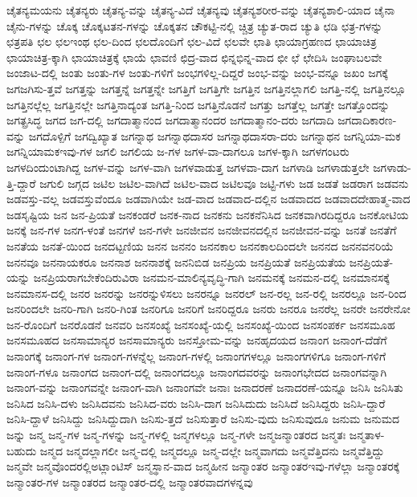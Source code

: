 {ಚೈತನ್ಯಮಯನು
ಚೈತನ್ಯರು
ಚೈತನ್ಯ-ವನ್ನು
ಚೈತನ್ಯ-ವಿದೆ
ಚೈತನ್ಯವು
ಚೈತನ್ಯಶರೀರ-ವನ್ನು
ಚೈತನ್ಯಶಾಲಿ-ಯಾದ
ಚೈನಾ
ಚೈನು-ಗಳನ್ನು
ಚೊಕ್ಕ
ಚೊಕ್ಕಟತನ-ಗಳನ್ನು
ಚೊಕ್ಕತನ
ಚೌಕಟ್ಟಿ-ನಲ್ಲಿ
ಚ್ಚಿತ್ರ
ಚ್ಯುತ-ರಾದ
ಚ್ಯುತಿ
ಛಡಿ
ಛತ್ರ-ಗಳನ್ನು
ಛತ್ರಪತಿ
ಛಲ
ಛಲಇಂಥ
ಛಲ-ದಿಂದ
ಛಲದೊಂದಿಗೆ
ಛಲ-ವಿದೆ
ಛಲವೇ
ಛಾತಿ
ಛಾಯಾಗ್ರಹಣದ
ಛಾಯಾಚಿತ್ರ
ಛಾಯಾಚಿತ್ರ-ಕ್ಕಾಗಿ
ಛಾಯಾಚಿತ್ರಕ್ಕೆ
ಛಾಯೆ
ಛಾವಣಿ
ಛಿದ್ರ-ವಾದ
ಛಿನ್ನಭಿನ್ನ-ವಾದ
ಛೀ
ಛೆ
ಛೇದಿಸಿ
ಜಂಘಾಬಲವೇ
ಜಂಜಾಟ-ದಲ್ಲಿ
ಜಂತು
ಜಂತು-ಗಳ
ಜಂತು-ಗಳಿಗೆ
ಜಂಭಗಳಿಲ್ಲ-ದಿದ್ದರೆ
ಜಂಭ-ವನ್ನು
ಜಂಭ-ವನ್ನೂ
ಜಖಂ
ಜಗಕ್ಕೆ
ಜಗಜಗಿಸು-ತ್ತವೆ
ಜಗತ್ತನ್ನು
ಜಗತ್ತನ್ನೆ
ಜಗತ್ತನ್ನೇ
ಜಗತ್ತಿಗೆ
ಜಗತ್ತಿಗೇ
ಜಗತ್ತಿನ
ಜಗತ್ತಿನಲ್ಲಾಗಲಿ
ಜಗತ್ತಿ-ನಲ್ಲಿ
ಜಗತ್ತಿನಲ್ಲೂ
ಜಗತ್ತಿನಲ್ಲೆಲ್ಲ
ಜಗತ್ತಿನಲ್ಲೇ
ಜಗತ್ತಿನಾದ್ಯಂತ
ಜಗತ್ತಿ-ನಿಂದ
ಜಗತ್ತಿನೊಡನೆ
ಜಗತ್ತು
ಜಗತ್ತೆಲ್ಲ
ಜಗತ್ತೇ
ಜಗತ್ತೊಂದನ್ನು
ಜಗತ್ಪ್ರಸಿದ್ಧ
ಜಗದ
ಜಗ-ದಲ್ಲಿ
ಜಗದಾತ್ಮಾನಂದ
ಜಗದಾತ್ಮಾನಂದರ
ಜಗದಾತ್ಮಾನಂ-ದರು
ಜಗದಾದಿ
ಜಗದಾದಿಕಾರಣ-ವನ್ನು
ಜಗದೊಳ್ಪಿಗೆ
ಜಗದ್ವಿಖ್ಯಾತ
ಜಗನ್ನಾಥ
ಜಗನ್ನಾಥದಾಸರ
ಜಗನ್ನಾಥದಾಸರಾ-ದರು
ಜಗನ್ನಾಥನ
ಜಗನ್ನಿಯಾ-ಮಕ
ಜಗನ್ನಿಯಾಮಕಇವು-ಗಳ
ಜಗಲಿ
ಜಗಲಿಯ
ಜ-ಗಳ
ಜಗಳ-ವಾ-ದಾಗಲೂ
ಜಗಳ-ಕ್ಕಾಗಿ
ಜಗಳಗಂಟರು
ಜಗಳದಿಂದುಂಟಾಗಿದ್ದ
ಜಗಳ-ವನ್ನು
ಜಗಳ-ವಾಗಿ
ಜಗಳವಾಡುತ್ತ
ಜಗಳವಾ-ದಾಗ
ಜಗಳಾಡಿ
ಜಗಳಾಡುತ್ತಲೇ
ಜಗಳಾಡು-ತ್ತಿ-ದ್ದಾರೆ
ಜಗುಲಿ
ಜಗ್ಗದ
ಜಟಿಲ
ಜಟಿಲ-ವಾಗಿದೆ
ಜಟಿಲ-ವಾದ
ಜಟಿಲವೂ
ಜಟ್ಟಿ-ಗಳು
ಜಡ
ಜಡತೆ
ಜಡರಾಗ
ಜಡವನು
ಜಡವಸ್ತು-ವಲ್ಲ
ಜಡವಸ್ತುವೆಂದೂ
ಜಡವಾಗಿಯೇ
ಜಡ-ವಾದ
ಜಡವಾದ-ದಲ್ಲಿನ
ಜಡವಾದದ
ಜಡವಾದದೇಹಾತ್ಮ-ವಾದ
ಜಡಸೃಷ್ಟಿಯ
ಜನ
ಜನ-ಪ್ರಿಯತೆ
ಜನಕಂಡರೆ
ಜನಕ-ನಾದ
ಜನಕನು
ಜನಕನೆನಿಸಿದ
ಜನಕವಾಗಿರದಿದ್ದರೂ
ಜನಕೋಟಿಯ
ಜನಕ್ಕೆ
ಜನ-ಗಳ
ಜನಗ-ಳಂತೆ
ಜನಗಳೆ
ಜನ-ಗಳೇ
ಜನಜೀವನ
ಜನಜೀವನದಲ್ಲಿನ
ಜನಜೀವನ-ವನ್ನು
ಜನತೆ
ಜನತೆಗೆ
ಜನತೆಯ
ಜನತೆ-ಯಿಂದ
ಜನದಟ್ಟಣಿಯ
ಜನನ
ಜನನಂ
ಜನನಕಾಲ
ಜನನಕಾಲದಿಂದಲೇ
ಜನನದ
ಜನನವನರಿಯೆ
ಜನನವೂ
ಜನನಾಯಕರೂ
ಜನನಾಶ
ಜನನಾಶಕ್ಕೆ
ಜನನಿಬಿಡ
ಜನಪ್ರಿಯ
ಜನಪ್ರಿಯತೆ
ಜನಪ್ರಿಯತೆಯ
ಜನಪ್ರಿಯತೆ-ಯನ್ನು
ಜನಪ್ರಿಯರಾಗಬೇಕೆಂದಿರುವಿರಾ
ಜನಮನ-ಮಾಲಿನ್ಯವೃದ್ಧಿ-ಗಾಗಿ
ಜನಮನಕ್ಕೆ
ಜನಮನ-ದಲ್ಲಿ
ಜನಮಾನಸಕ್ಕೆ
ಜನಮಾನಸ-ದಲ್ಲಿ
ಜನರ
ಜನರನ್ನು
ಜನರನ್ನುಳಿಸಲು
ಜನರನ್ನೂ
ಜನರಲ್
ಜನ-ರಲ್ಲ
ಜನ-ರಲ್ಲಿ
ಜನರಲ್ಲೂ
ಜನ-ರಿಂದ
ಜನರಿಂದಲೇ
ಜನರಿ-ಗಾಗಿ
ಜನರಿ-ಗಿಂತ
ಜನರಿಗೂ
ಜನರಿಗೆ
ಜನರಿದ್ದರೂ
ಜನರು
ಜನರೂ
ಜನರೆಲ್ಲ
ಜನರೇ
ಜನರೇನೋ
ಜನ-ರೊಂದಿಗೆ
ಜನರೊಡನೆ
ಜನವರಿ
ಜನಸಂಖ್ಯೆ
ಜನಸಂಖ್ಯೆ-ಯಲ್ಲಿ
ಜನಸಂಖ್ಯೆ-ಯಿಂದ
ಜನಸಂಪರ್ಕ
ಜನಸಮೂಹ
ಜನಸಮೂಹದ
ಜನಸಾಮಾನ್ಯರ
ಜನಸಾಮಾನ್ಯರು
ಜನಸ್ತೋಮ-ವನ್ನು
ಜನಹೃದಯದ
ಜನಾಂಗ
ಜನಾಂಗ-ದೆಡೆಗೆ
ಜನಾಂಗಕ್ಕೆ
ಜನಾಂಗ-ಗಳ
ಜನಾಂಗ-ಗಳನ್ನೆಲ್ಲ
ಜನಾಂಗ-ಗಳಲ್ಲಿ
ಜನಾಂಗಗಳಲ್ಲೂ
ಜನಾಂಗಗಳಿಗೂ
ಜನಾಂಗ-ಗಳಿಗೆ
ಜನಾಂಗ-ಗಳೂ
ಜನಾಂಗದ
ಜನಾಂಗ-ದಲ್ಲಿ
ಜನಾಂಗದಲ್ಲೂ
ಜನಾಂಗದವರನ್ನು
ಜನಾಂಗಭೇದದ
ಜನಾಂಗವನ್ನಾಗಿ
ಜನಾಂಗ-ವನ್ನು
ಜನಾಂಗವನ್ನೇ
ಜನಾಂಗ-ವಾಗಿ
ಜನಾಂಗವೇ
ಜನಾಃ
ಜನಾದರಣೆ
ಜನಾದರಣೆ-ಯನ್ನೂ
ಜನಿಸಿ
ಜನಿಸಿತು
ಜನಿಸಿದ
ಜನಿಸಿ-ದಳು
ಜನಿಸಿದವನು
ಜನಿಸಿದ-ವರು
ಜನಿಸಿ-ದಾಗ
ಜನಿಸಿದುದು
ಜನಿಸಿದೆ
ಜನಿಸಿದ್ದರು
ಜನಿಸಿ-ದ್ದಾರೆ
ಜನಿಸಿ-ದ್ದಾಳೆ
ಜನಿಸಿದ್ದು
ಜನಿಸಿದ್ದುದಾಗಿ
ಜನಿಸು-ತ್ತದೆ
ಜನಿಸುತ್ತಾರೆ
ಜನಿಸು-ವುದು
ಜನಿಸುವುದೂ
ಜನುಮ
ಜನುಮದ
ಜನ್ನು
ಜನ್ಮ
ಜನ್ಮ-ಗಳ
ಜನ್ಮ-ಗಳನ್ನು
ಜನ್ಮ-ಗಳಲ್ಲಿ
ಜನ್ಮಗಳಲ್ಲೂ
ಜನ್ಮ-ಗಳೇ
ಜನ್ಮಜನ್ಮಾಂತರದ
ಜನ್ಮತಃ
ಜನ್ಮತಾಳ-ಬಹುದು
ಜನ್ಮದ
ಜನ್ಮದಲ್ಲಾಗಲೀ
ಜನ್ಮ-ದಲ್ಲಿ
ಜನ್ಮದಲ್ಲೂ
ಜನ್ಮ-ದಲ್ಲೇ
ಜನ್ಮವಾಗದು
ಜನ್ಮವೆತ್ತಿದನು
ಜನ್ಮವೆತ್ತಿದ್ದು
ಜನ್ಮವೇ
ಜನ್ಮವೊಂದರಲ್ಲಿಅಟ್ಲಾಂಟಿಸ್
ಜನ್ಮಸ್ಥಾನ-ವಾದ
ಜನ್ಮಹೀನ
ಜನ್ಮಾಂತರ
ಜನ್ಮಾಂತರಇವು-ಗಳೆಲ್ಲಾ
ಜನ್ಮಾಂತರಕ್ಕೆ
ಜನ್ಮಾಂತರ-ಗಳ
ಜನ್ಮಾಂತರದ
ಜನ್ಮಾಂತರ-ದಲ್ಲಿ
ಜನ್ಮಾಂತರವಾದಗಳನ್ನವು
}
